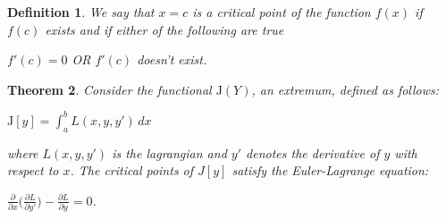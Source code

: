 \documentclass[a4paper]{book}
\newtheorem{theorem}{Theorem}%
\newtheorem{definition}[theorem]{Definition}%
\numberwithin{theorem}{section}%
\begin{document}
\begin{definition}
    We say that $x=c$ is a critical point of the function $f(x)$ if $f(c)$ exists and if either of the following are true
    \begin{center}
        $f'(c)=0$ OR $f'(c)$ doesn't exist.
    \end{center}
\end{definition}

\begin{theorem}
	Consider the functional $\mathrm{J}(Y)$, an extremum, defined as follows:
	\begin{center}
		$\displaystyle \mathrm{J}[y]=\int_{a}^{b}L(x,y,y')\,dx$
	\end{center}
	where $L(x,y,y')$ is the lagrangian and $y'$ denotes the derivative of $y$ with respect to $x$. The critical points of $J[y]$ satisfy the Euler-Lagrange equation:
	\begin{center}
		$\displaystyle \frac{\partial}{\partial x}\Big(\frac{\partial L}{\partial y'}\Big)-\frac{\partial L}{\partial y}=0$.
	\end{center}
\end{theorem}
\end{document}
